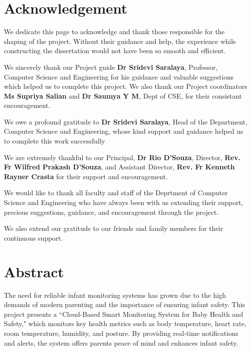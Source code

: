 \documentclass[12pt,a4paper]{report}
\begin{document}
\chapter*{\centering Acknowledgement}
We dedicate this page to acknowledge and thank those responsible for the shaping of the project. Without their guidance and help, the experience while constructing the dissertation would not have been so smooth and efficient.
\par
\vspace{0.15in}
\noindent We sincerely thank our Project guide \textbf{Dr Sridevi Saralaya}, Professor, Computer Science and Engineering for his guidance and valuable suggestions which helped us to complete this project. We also thank our Project coordinators \textbf{Ms Supriya Salian} and \textbf{Dr Saumya Y M},  Dept of CSE, for their consistant encouragement.
\par
\vspace{0.15in}
\noindent We owe a profound gratitude to \textbf{Dr Sridevi Saralaya}, Head of the Department, Computer Science and Engineering, whose kind support and guidance helped us to complete this work successfully
\par
\vspace{0.15in}
\noindent We are extremely thankful to our Principal, \textbf{Dr Rio D’Souza}, Director,  \textbf{Rev. Fr Wilfred Prakash D'Souza}, and Assistant Director, \textbf{Rev. Fr Kenneth Rayner Crasta} for their support and encouragement.
\par
\vspace{0.15in}
\noindent We would like to thank all faculty and staff of the Deprtment of Computer Science and Engineering who have always been with us extending their support, precious suggestions, guidance, and encouragement through the project.
\par
\vspace{0.15in}
\noindent We also extend our gratitude to our friends and family members for their continuous support.


\pagestyle{plain}
\chapter*{\centering Abstract}
The need for reliable infant monitoring systems has grown due to the high demands of modern parenting and the importance of ensuring infant safety. This project presents a ``Cloud-Based Smart Monitoring System for Baby Health and Safety," which monitors key health metrics such as body temperature, heart rate, room temperature, humidity, and posture. By providing real-time notifications and alerts, the system offers parents peace of mind and enhances infant safety. \\
  
\end{document}

